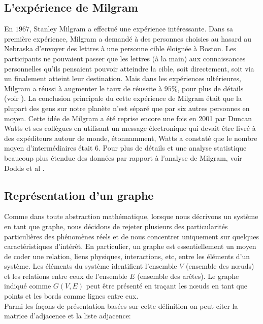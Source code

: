   \subsection{L’expérience de Milgram}
 \label{Milgram} 
En $1967$, Stanley Milgram a effectué une expérience intéressante.  Dans sa première expérience, Milgram a demandé à des personnes choisies au hasard au Nebraska d'envoyer des lettres à une personne cible éloignée à Boston.
Les participants ne pouvaient passer que les lettres (à la main) aux connaissances personnelles qu'ils pensaient pouvoir 
atteindre la cible, soit directement, soit via un %
finalement atteint leur destination. Mais dans les expériences ultérieures, Milgram a réussi à augmenter
le taux de réussite à $95\%$, pour plus de détails (voir \cite{Mi1967,TM1969}). La conclusion principale du cette expérience
de Milgram était que la plupart des gens sur notre planète n'est séparé que par six autres personnes en moyen. Cette idée de
Milgram a été reprise encore une fois en 2001 par Duncan Watts et ses collègues en utilisant un message électronique qui devait être livré à des expéditeurs autour de monde, étonnamment, Watts a constaté que le nombre moyen d'intermédiaires était
$6$. Pour plus de détails et une analyse statistique beaucoup plus étendue des données par rapport à l'analyse de Milgram,
voir Dodds et al \cite{D-al2003}.

  \subsection{Représentation d'un graphe}
  Comme dans toute abstraction mathématique, lorsque nous décrivons un système en tant que graphe, nous décidons de rejeter  plusieurs des particularités particulières des phénomènes réels et de nous concentrer uniquement sur quelques caractéristiques  d'intérêt. En particulier, un graphe est essentiellement un moyen de coder une relation, liens physiques, interactions,
  etc, entre les éléments d'un système. Les éléments du système identifient l'ensemble $V$ (ensemble des nœuds) et les relations entre ceux de l'ensemble $E$ (ensemble des arêtes). Le graphe indiqué comme $G(V, E)$ peut être présenté en traçant les  nœuds en tant que points et les bords comme lignes entre eux.\\ 
 
   Parmi les façons de présentation basées sur cette définition on peut citer la matrice d'adjacence et la liste adjacence:
